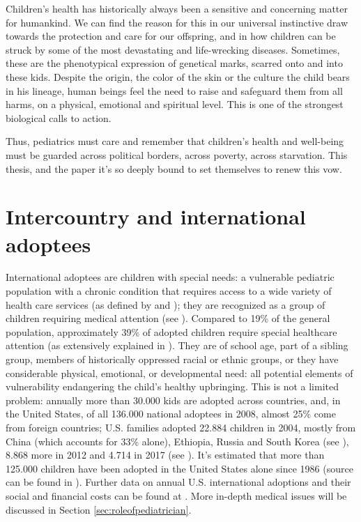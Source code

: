 

\label{chap:introduction}
Children's health has historically always been a sensitive and concerning matter for humankind. We can find the reason for this in our universal instinctive draw towards the protection and care for our offspring, and in how children can be struck by some of the most devastating and life-wrecking diseases. Sometimes, these are the phenotypical expression of genetical marks, scarred onto and into these kids. Despite the origin, the color of the skin or the culture the child bears in his lineage, human beings feel the need to raise and safeguard them from all harms, on a physical, emotional and spiritual level. This is one of the strongest biological calls to action.

Thus, pediatrics must care and remember that children's health and well-being must be guarded across political borders, across poverty, across starvation. This thesis, and the paper it's so deeply bound to set themselves to renew this vow.

\section{Intercountry and international adoptees}\label{sec:internationaladoptees}
International adoptees are children with special needs: a vulnerable pediatric population with a chronic condition that requires access to a wide variety of health care services (as defined by \cite{notonlyinfectious} and \cite{nonsoloinfezioni}); they are recognized as a group of children requiring medical attention (see \cite{caringfor}). Compared to 19\% of the general population, approximately 39\% of adopted children require special healthcare attention (as extensively explained in \cite{nelson}). They are of school age, part of a sibling group, members of historically oppressed racial or ethnic groups, or they have considerable physical, emotional, or developmental need: all potential elements of vulnerability endangering the child's healthy upbringing. This is not a limited problem: annually more than 30.000 kids are adopted across countries, and, in the United States, of all 136.000 national adoptees in 2008, almost 25\% come from foreign countries; U.S. families adopted 22.884 children in 2004, mostly from China (which accounts for 33\% alone), Ethiopia, Russia and South Korea (see \cite{nelson}), 8.868 more in 2012 and 4.714 in 2017 (see \cite{usreport}). It's estimated that more than 125.000 children have been adopted in the United States alone since 1986 (source can be found in \cite{caringfor}). Further data on annual U.S. international adoptions and their social and financial costs can be found at \cite{usreportsite}. More in-depth medical issues will be discussed in Section \ref{sec:roleofpediatrician}.

